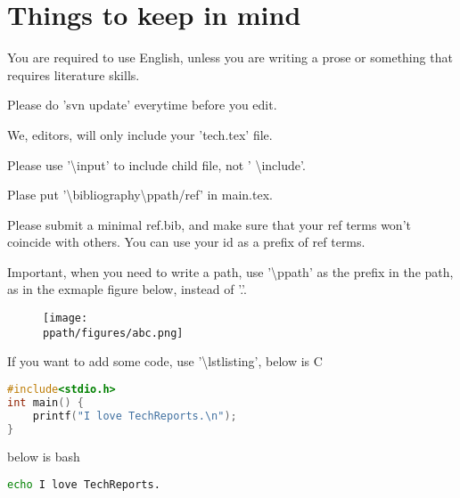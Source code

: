 
\section{Things to keep in mind}
\label{sec:intro}
You are required to use English, unless you are writing a prose or something that requires literature skills.

Please do 'svn update' everytime before you edit.

We, editors, will only include your 'tech.tex' file.

Please use '\textbackslash input' to include child file, not '
\textbackslash include'.

Plase put '\textbackslash bibliography{\textbackslash ppath/ref}' in main.tex\cite{sjtuTech}.

Please submit a minimal ref.bib, and make sure that your ref terms won't coincide with others. You can use your id as a prefix of ref terms.

Important, when you need to write a path, use '\textbackslash ppath' as the prefix in the path, as in the exmaple figure below, instead of '.'.

\begin{figure}[htbp]
\centering
\texttt{[image: \\ppath/figures/abc.png]}
\label{fig:abc}
\end{figure}

If you want to add some code, use '\textbackslash lstlisting', below is C
\begin{lstlisting}[language=C]
#include<stdio.h>
int main() {
	printf("I love TechReports.\n");
}
\end{lstlisting}
below is bash
\begin{lstlisting}[language=bash]
echo I love TechReports.
\end{lstlisting}
